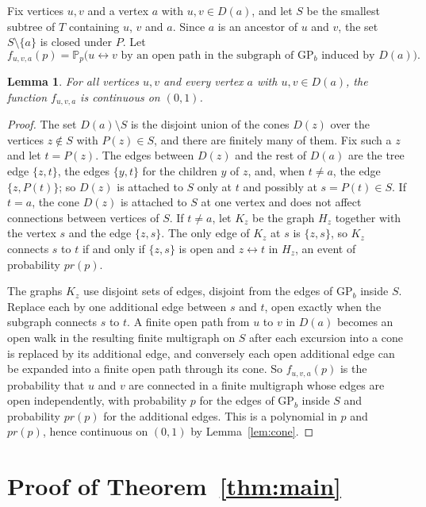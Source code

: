 \documentclass[11pt]{amsart}
\newtheorem{lemma}[theorem]{Lemma}
\theoremstyle{remark}
\newcommand{\PP}{\mathbb{P}}
\newcommand{\GP}{\mathrm{GP}_b}
\begin{document}
Fix vertices $u,v$ and a vertex $a$ with $u,v\in D(a)$, and let $S$ be the smallest subtree of $T$ containing $u$, $v$
and $a$. Since $a$ is an ancestor of $u$ and $v$, the set $S\setminus\{a\}$ is closed under $P$. Let
\[
f_{u,v,a}(p)=\PP_p\bigl(u\leftrightarrow v\text{ by an open path in the subgraph of }\GP\text{ induced by }D(a)\bigr).
\]

\begin{lemma}\label{lem:finite}
For all vertices $u,v$ and every vertex $a$ with $u,v\in D(a)$, the function $f_{u,v,a}$ is continuous on $(0,1)$.
\end{lemma}

\begin{proof}
The set $D(a)\setminus S$ is the disjoint union of the cones $D(z)$ over the vertices $z\notin S$ with $P(z)\in S$, and
there are finitely many of them. Fix such a $z$ and let $t=P(z)$. The edges between $D(z)$ and the rest of $D(a)$ are the
tree edge $\{z,t\}$, the edges $\{y,t\}$ for the children $y$ of $z$, and, when $t\neq a$, the edge $\{z,P(t)\}$; so
$D(z)$ is attached to $S$ only at $t$ and possibly at $s=P(t)\in S$. If $t=a$, the cone $D(z)$ is attached to $S$ at one
vertex and does not affect connections between vertices of $S$. If $t\neq a$, let $K_z$ be the graph $H_z$ together with
the vertex $s$ and the edge $\{z,s\}$. The only edge of $K_z$ at $s$ is $\{z,s\}$, so $K_z$ connects $s$ to $t$ if and
only if $\{z,s\}$ is open and $z\leftrightarrow t$ in $H_z$, an event of probability $pr(p)$.

The graphs $K_z$ use disjoint sets of edges, disjoint from the edges of $\GP$ inside $S$. Replace
each by one additional edge between $s$ and $t$, open exactly when the subgraph connects $s$ to $t$. A finite open path
from $u$ to $v$ in $D(a)$ becomes an open walk in the resulting finite multigraph on $S$ after each excursion into a cone
is replaced by its additional edge, and conversely each open additional edge can be expanded into a finite open path
through its cone. So $f_{u,v,a}(p)$ is the probability that $u$ and $v$ are connected in a finite multigraph whose edges
are open independently, with probability $p$ for the edges of $\GP$ inside $S$ and probability $pr(p)$ for the
additional edges. This is a polynomial in $p$ and $pr(p)$, hence continuous on $(0,1)$ by Lemma~\ref{lem:cone}.
\end{proof}

\section{Proof of Theorem~\ref{thm:main}}\label{sec:proof}
\end{document}
